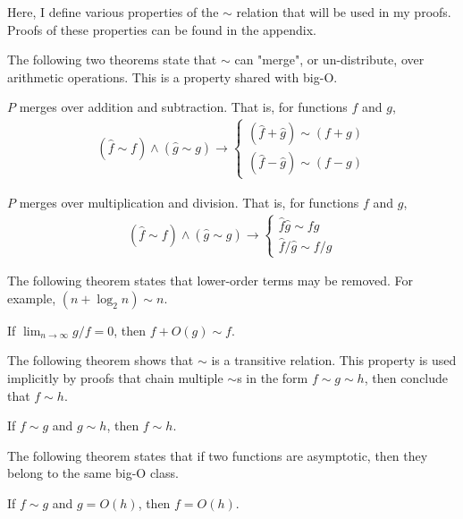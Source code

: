 Here, I define various properties of the $\sim$ relation that will be used in my proofs. Proofs of these properties can be found in the appendix.

The following two theorems state that $\sim$ can "merge", or un-distribute, over arithmetic operations. This is a property shared with big-O.

\begin{theorem}
\label{thm:MergesOverArithmeticAdd}
	$P$ merges over addition and subtraction. That is, for functions $f$ and $g$,
	\begin{align*}
	(\hat{f} \sim f) \land (\hat{g} \sim g) \rightarrow \begin{cases}
		(\hat{f} + \hat{g}) \sim (f + g)\\
		(\hat{f} - \hat{g}) \sim (f - g)
	\end{cases}
	\end{align*}
\end{theorem}

\begin{theorem}
\label{thm:MergesOverArithmeticMultiply}
	$P$ merges over multiplication and division. That is, for functions $f$ and $g$,
	\begin{align*}
	(\hat{f} \sim f) \land (\hat{g} \sim g) \rightarrow \begin{cases}
	\hat{f}\hat{g} \sim fg\\
	\hat{f} / \hat{g} \sim f / g
	\end{cases}
	\end{align*}
\end{theorem}

The following theorem states that lower-order terms may be removed. For example, $(n + \log_2 n) \sim n$.

\begin{theorem}
\label{thm:RemovesLowerOrderTerms}
	If $\lim_{n \to \infty} g / f = 0$, then $f + O(g) \sim f$.
\end{theorem}

The following theorem shows that $\sim$ is a transitive relation. This property is used implicitly by proofs that chain multiple $\sim$s in the form $f \sim g \sim h$, then conclude that $f \sim h$.

\begin{theorem}
\label{thm:Transitivity}
	If $f \sim g$ and $g \sim h$, then $f \sim h$.
\end{theorem}

The following theorem states that if two functions are asymptotic, then they belong to the same big-O class.

\begin{theorem}
\label{thm:SameBigOClass}
	If $f \sim g$ and $g = O(h)$, then $f = O(h)$.
\end{theorem}